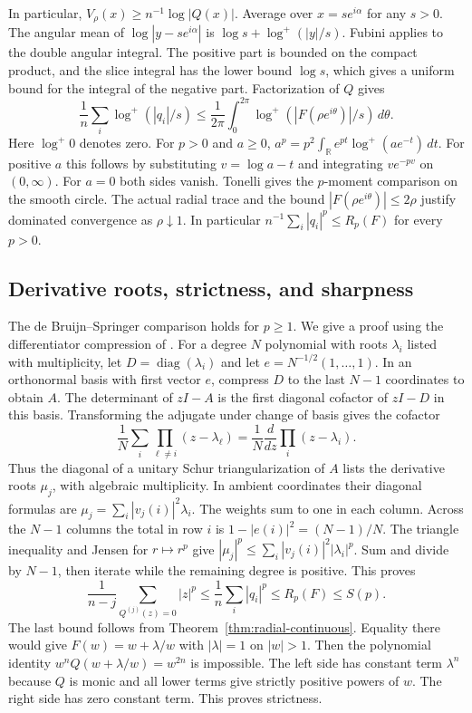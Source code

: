 \documentclass[11pt]{article}
\begin{document}
	In particular, $V_\rho(x)\ge n^{-1}\log|Q(x)|$. Average over
	$x=s e^{i\alpha}$ for any $s>0$. The angular mean of
	$\log|y-s e^{i\alpha}|$ is $\log s+\log^+(|y|/s)$.
	Fubini applies to the double angular integral. The positive
	part is bounded on the compact product, and the slice integral has
	the lower bound $\log s$, which gives a uniform bound for the
	integral of the negative part. Factorization of $Q$ gives
	\[
	\frac1n\sum_i\log^+(|q_i|/s)
	\le \frac1{2\pi}\int_0^{2\pi}
	\log^+(|F(\rho e^{i\theta})|/s)\,d\theta.
	\]
	Here $\log^+0$ denotes zero. For $p>0$ and $a\ge0$,
	$a^p=p^2\int_{\mathbb R} e^{pt}\log^+(a e^{-t})\,dt$.
	For positive $a$ this follows by substituting $v=\log a-t$ and
	integrating $v e^{-pv}$ on $(0,\infty)$. For $a=0$ both sides
	vanish. Tonelli gives the $p$-moment comparison on the smooth
	circle. The actual radial trace and the bound
	$|F(\rho e^{i\theta})|\le2\rho$ justify dominated convergence as
	$\rho\downarrow1$. In particular
	$n^{-1}\sum_i|q_i|^p\le R_p(F)$ for every $p>0$.
	
	\subsection{Derivative roots, strictness, and sharpness}
	The de Bruijn--Springer comparison \cite[Theorem~4]{DBS1947}
	holds for $p\ge1$. We give a proof using the differentiator compression of \cite{Pereira}.
	For a degree $N$ polynomial with roots $\lambda_i$ listed with
	multiplicity, let $D=\operatorname{diag}(\lambda_i)$ and let
	$e=N^{-1/2}(1,\ldots,1)$. In an orthonormal basis with first vector
	$e$, compress $D$ to the last $N-1$ coordinates to obtain $A$.
	The determinant of $zI-A$ is the first diagonal cofactor of $zI-D$
	in this basis. Transforming the adjugate under change of basis
	gives the cofactor
	\[
	\frac1N\sum_i\prod_{\ell\ne i}(z-\lambda_\ell)
	=\frac1N\frac{d}{dz}\prod_i(z-\lambda_i).
	\]
	Thus the diagonal of a unitary Schur triangularization of $A$ lists
	the derivative roots $\mu_j$, with algebraic multiplicity. In
	ambient coordinates their diagonal formulas are
	$\mu_j=\sum_i|v_j(i)|^2\lambda_i$. The weights sum to one in each
	column. Across the $N-1$ columns the total in row $i$ is
	$1-|e(i)|^2=(N-1)/N$. The triangle inequality and Jensen for
	$r\mapsto r^p$ give
	$|\mu_j|^p\le\sum_i |v_j(i)|^2 |\lambda_i|^p$.
	Sum and divide by $N-1$, then iterate while the remaining degree
	is positive. This proves
	\[
	\frac{1}{n-j}\sum_{Q^{(j)}(z)=0}|z|^p
	\le \frac1n\sum_i|q_i|^p
	\le R_p(F) \le S(p).
	\]
	The last bound follows from Theorem~\ref{thm:radial-continuous}.
	Equality there would give $F(w)=w+\lambda/w$ with $|\lambda|=1$
	on $|w|>1$. Then the polynomial identity
	$w^nQ(w+\lambda/w)=w^{2n}$ is impossible. The left side has
	constant term $\lambda^n$ because $Q$ is monic and all lower
	terms give strictly positive powers of $w$. The right side has
	zero constant term. This proves strictness.
	
\end{document}

